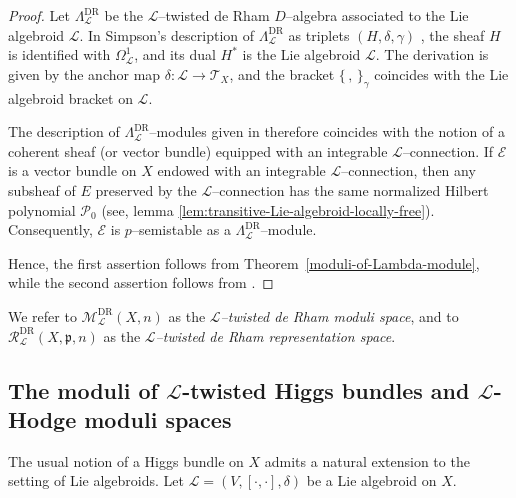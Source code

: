 \documentclass[12pt,reqno]{amsart}
\numberwithin{equation}{subsection}
\theoremstyle{definition}
\theoremstyle{theorem}
\begin{document}
\begin{proof}
Let $\Lambda^{\text{DR}}_{\mathcal{L}}$ be the $\mathcal{L}$--twisted de Rham $D$--algebra associated to the Lie algebroid $\mathcal{L}$. In Simpson’s description of $\Lambda^{\text{DR}}_{\mathcal{L}}$ as triplets $(H,\delta,\gamma)$ \cite[\S\,2, p.~82]{CT.Simpson-1994}, the sheaf $H$ is identified with
$\Omega^{1}_{\mathcal{L}}$, and its dual $H^{*}$ is the Lie algebroid
$\mathcal{L}$. The derivation is given by the anchor map
$\delta \colon \mathcal{L} \to \mathcal{T}_{X}$, and the bracket
$\{\,,\,\}_{\gamma}$ coincides with the Lie algebroid bracket on
$\mathcal{L}$.

The description of $\Lambda^{\text{DR}}_{\mathcal{L}}$--modules given in
\cite[\S\,2, Lemma~2.13]{CT.Simpson-1994} therefore coincides with the notion
of a coherent sheaf (or vector bundle) equipped with an integrable
$\mathcal{L}$--connection. If $\mathcal{E}$ is a vector bundle on $X$ endowed with an integrable $\mathcal{L}$--connection, then any subsheaf of $E$ preserved by the $\mathcal{L}$--connection has the same normalized Hilbert polynomial $\mathcal{P}_{0}$ (see, lemma \eqref{lem:transitive-Lie-algebroid-locally-free}). Consequently, $\mathcal{E}$ is $p$--semistable as a $\Lambda^{\text{DR}}_{\mathcal{L}}$--module.

Hence, the first assertion follows from
Theorem~\eqref{moduli-of-Lambda-module}, while the second assertion follows
from \cite[\S\,4, Theorem~4.10]{CT.Simpson-1994}.

\end{proof}
We refer to $\mathcal{M}^{\text{DR}}_{\mathcal{L}}(X,n)$ as the \emph{$\mathcal{L}$--twisted de Rham moduli space}, and to $\mathcal{R}^{\text{DR}}_{\mathcal{L}}(X,\mathfrak{p},n)$ as the \emph{$\mathcal{L}$--twisted de Rham representation space}.


\subsection{The moduli of $\mathcal{L}$-twisted Higgs bundles and $\mathcal{L}$-Hodge moduli spaces}\label{subsec: L-Hodge modul space}
The usual notion of a Higgs bundle on $X$ admits a natural extension to the setting of Lie algebroids. Let $\mathcal{L} = (V,[\cdot,\cdot],\delta)$ be a Lie algebroid on $X$.
\end{document}
